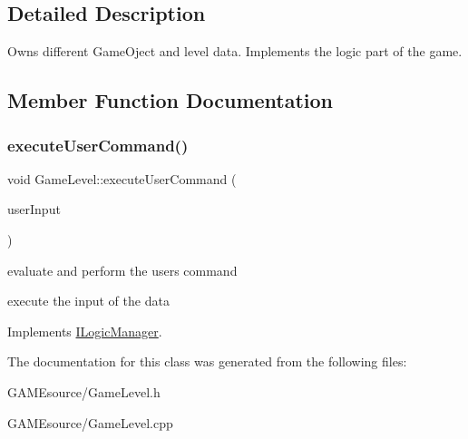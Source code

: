 \subsection{Detailed Description}
Owns different Game\+Oject and level data. Implements the logic part of the game. 

\subsection{Member Function Documentation}
\mbox{\label{class_game_level_a53cd899aa9aeaf3e9579ff32598b0043}} 
\subsubsection{\texorpdfstring{execute\+User\+Command()}{executeUserCommand()}}
{\footnotesize\ttfamily void Game\+Level\+::execute\+User\+Command (\begin{DoxyParamCaption}\item[{User\+Input\+Type}]{user\+Input }\end{DoxyParamCaption})\hspace{0.3cm}{\ttfamily [virtual]}}



evaluate and perform the user\textquotesingle{}s command 

execute the input of the data 

Implements \mbox{\hyperlink{class_i_logic_manager_a531478a93285f5cdf6f22294638b27b3}{I\+Logic\+Manager}}.



The documentation for this class was generated from the following files\+:\begin{DoxyCompactItemize}
\item 
G\+A\+M\+Esource/Game\+Level.\+h\item 
G\+A\+M\+Esource/Game\+Level.\+cpp\end{DoxyCompactItemize}
